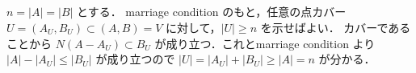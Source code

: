 \subsection{}
$n = |A| = |B|$ とする．
marriage condition のもと，任意の点カバー $U = (A_U, B_U)\subset (A,B) = V$ に対して，$|U| \geq n$ を示せばよい．
カバーであることから $N(A-A_U)\subset B_U$ が成り立つ．これとmarriage condition より $|A|-|A_U|\leq |B_U|$ が成り立つので
$|U| = |A_U|+|B_U| \geq |A| = n$ が分かる．